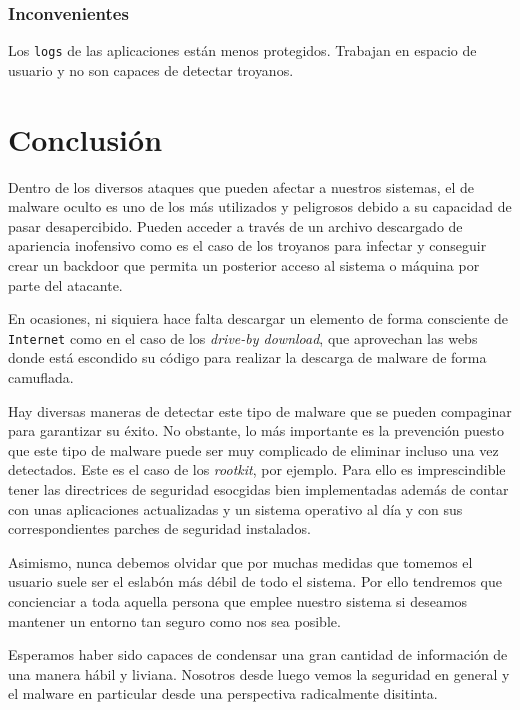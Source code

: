 \documentclass[12pt]{article}
\newcommand{\newpar} {
    \vskip 0.5cm
}
\begin{document}
            \subsubsection{Inconvenientes}
                Los \texttt{logs} de las aplicaciones están menos protegidos. Trabajan en espacio de usuario y no son capaces de detectar troyanos.

    \section{Conclusión}
        Dentro de los diversos ataques que pueden afectar a nuestros sistemas, el de malware oculto es uno de los más utilizados y peligrosos debido a su capacidad de pasar desapercibido. Pueden acceder a través de un archivo descargado de apariencia inofensivo como es el caso de los troyanos para infectar y conseguir crear un backdoor que permita un posterior acceso al sistema o máquina por parte del atacante.

        \newpar

        En ocasiones, ni siquiera hace falta descargar un elemento de forma consciente de \texttt{Internet} como en el caso de los \textit{drive-by download}, que aprovechan las webs donde está escondido su código para realizar la descarga de malware de forma camuflada.

        \newpar

        Hay diversas maneras de detectar este tipo de malware que se pueden compaginar para garantizar su éxito. No obstante, lo más importante es la prevención puesto que este tipo de malware puede ser muy complicado de eliminar incluso una vez detectados. Este es el caso de los \textit{rootkit}, por ejemplo. Para ello es imprescindible tener las directrices de seguridad esocgidas bien implementadas además de contar con unas aplicaciones actualizadas y un sistema operativo al día y con sus correspondientes parches de seguridad instalados.

        \newpar

        Asimismo, nunca debemos olvidar que por muchas medidas que tomemos el usuario suele ser el eslabón más débil de todo el sistema. Por ello tendremos que concienciar a toda aquella persona que emplee nuestro sistema si deseamos mantener un entorno tan seguro como nos sea posible.

        \newpar

        Esperamos haber sido capaces de condensar una gran cantidad de información de una manera hábil y liviana. Nosotros desde luego vemos la seguridad en general y el malware en particular desde una perspectiva radicalmente disitinta.

    \newpage

    \nocite{*}
    
    {}
\end{document}
